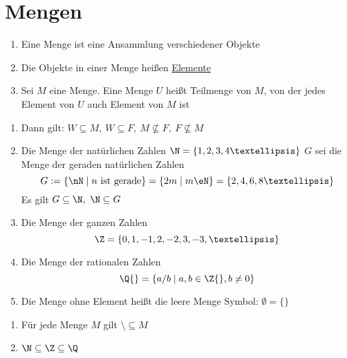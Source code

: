 
\chapter{Mengen}
\begin{enumerate}
\item{Eine Menge ist eine Ansammlung verschiedener Objekte}
\item{Die Objekte in einer Menge heißen \ul{Elemente}
}
%
\item{Sei $M$ eine Menge. Eine Menge $U$ heißt Teilmenge von $M$, von der jedes Element von $U$ auch Element von $M$ ist
}
\end{enumerate}

\begin{enumerate}
\item{
Dann gilt: $W \subseteq M,\ W \subseteq F,\ M \not\subseteq F,\ F\not\subseteq M$}
\item {Die Menge der natürlichen Zahlen
$\N = \{1,2,3,4 …\}$
$G$ sei die Menge der geraden natürlichen Zahlen
$$G := \{\nN \mid n\text{ ist gerade}\} = \{2m \mid m \eN\} = \{2,4,6,8 …\}$$
Es gilt $G \subseteq \N,\ \N \subseteq G$}
\item {Die Menge der ganzen Zahlen
$$\Z = \{0,1,-1,2,-2,3,-3, …\}$$}
\item {Die Menge der rationalen Zahlen
$$\Q{} = \{a/b\mid a, b \in \Z{}, b \neq 0\}$$}
\item {Die Menge ohne Element heißt die leere Menge
Symbol: $\emptyset = \{\}$}
\end{enumerate}
%
\bem
\begin{enumerate}
\item Für jede Menge $M$ gilt $\setminus \subseteq M$
\item $\N \subseteq \Z \subseteq \Q$
\end{enumerate}

